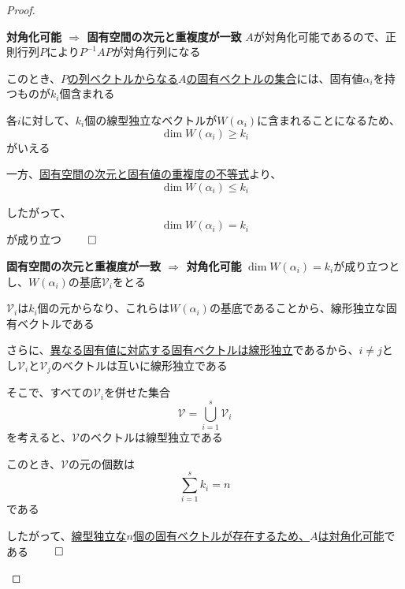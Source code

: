\documentclass[../../../topic_linear-algebra]{subfiles}
\begin{document}
\begin{proof}
  \begin{subpattern}{\bfseries 対角化可能 $\Longrightarrow$ 固有空間の次元と重複度が一致}
    $A$が対角化可能であるので、正則行列$P$により$P^{-1}AP$が対角行列になる

    このとき、\hyperref[thm:diagonalization-columns-are-eigenvectors]{$P$の列ベクトルからなる$A$の固有ベクトルの集合}には、固有値$\alpha_i$を持つものが$k_i$個含まれる

    \br

    各$i$に対して、$k_i$個の線型独立なベクトルが$W(\alpha_i)$に含まれることになるため、
    \begin{equation*}
      \dim W(\alpha_i) \geq k_i
    \end{equation*}
    がいえる

    \br

    一方、\hyperref[thm:geom-mult-leq-alg-mult]{固有空間の次元と固有値の重複度の不等式}より、
    \begin{equation*}
      \dim W(\alpha_i) \leq k_i
    \end{equation*}

    したがって、
    \begin{equation*}
      \dim W(\alpha_i) = k_i
    \end{equation*}
    が成り立つ $\qed$
  \end{subpattern}

  \begin{subpattern}{\bfseries 固有空間の次元と重複度が一致 $\Longrightarrow$ 対角化可能}
    $\dim W(\alpha_i) = k_i$が成り立つとし、$W(\alpha_i)$の基底$\mathcal{V}_i$をとる

    $\mathcal{V}_i$は$k_i$個の元からなり、これらは$W(\alpha_i)$の基底であることから、線形独立な固有ベクトルである

    \br

    さらに、\hyperref[thm:eigenvectors-of-distinct-eigenvalues-are-independent]{異なる固有値に対応する固有ベクトルは線形独立}であるから、$i\neq j$とし$\mathcal{V}_i$と$\mathcal{V}_j$のベクトルは互いに線形独立である

    そこで、すべての$\mathcal{V}_i$を併せた集合
    \begin{equation*}
      \mathcal{V} = \bigcup_{i=1}^s \mathcal{V}_i
    \end{equation*}
    を考えると、$\mathcal{V}$のベクトルは線型独立である

    \br

    このとき、$\mathcal{V}$の元の個数は
    \begin{equation*}
      \sum_{i=1}^s k_i = n
    \end{equation*}
    である

    \br

    したがって、\hyperref[thm:diagonalizable-iff-n-indep-eigenvectors]{線型独立な$n$個の固有ベクトルが存在するため、$A$は対角化可能}である $\qed$
  \end{subpattern}
\end{proof}
\end{document}
